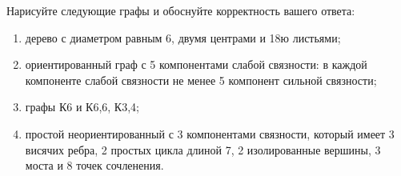 \question 
Нарисуйте следующие графы и обоснуйте корректность вашего ответа:
\begin{enumerate}
\item  дерево с диаметром равным 6, двумя центрами  и  18ю листьями;
\item  ориентированный граф с 5 компонентами слабой связности: в  каждой компоненте слабой связности не менее 5 компонент сильной связности;
\item  графы К6 и К6,6, К3,4;
\item  простой неориентированный с 3 компонентами связности, который имеет 3 висячих ребра, 2 простых цикла длиной 7, 2 изолированные вершины, 3 моста и 8 точек сочленения.
\end{enumerate}
